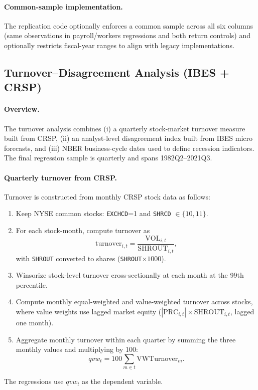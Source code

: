 \paragraph{Common-sample implementation.}
The replication code optionally enforces a common sample across all six columns (same observations in payroll/workers regressions and both return controls) and optionally restricts fiscal-year ranges to align with legacy implementations.

\subsection{Turnover--Disagreement Analysis (IBES + CRSP)}\label{app:data_turnover}

\paragraph{Overview.}
The turnover analysis combines (i) a quarterly stock-market turnover measure built from CRSP, (ii) an analyst-level disagreement index built from IBES micro forecasts, and (iii) NBER business-cycle dates used to define recession indicators. The final regression sample is quarterly and spans 1982Q2--2021Q3.

\paragraph{Quarterly turnover from CRSP.}
Turnover is constructed from monthly CRSP stock data as follows:
\begin{enumerate}
\item Keep NYSE common stocks: \texttt{EXCHCD}=1 and \texttt{SHRCD} $\in \{10,11\}$.
\item For each stock-month, compute turnover as
\[
\text{turnover}_{i,t}=\frac{\text{VOL}_{i,t}}{\text{SHROUT}_{i,t}},
\]
with \texttt{SHROUT} converted to shares (\texttt{SHROUT}$\times 1000$).
\item Winsorize stock-level turnover cross-sectionally at each month at the 99th percentile.
\item Compute monthly equal-weighted and value-weighted turnover across stocks, where value weights use lagged market equity (\(|\text{PRC}_{i,t}|\times \text{SHROUT}_{i,t}\), lagged one month).
\item Aggregate monthly turnover within each quarter by summing the three monthly values and multiplying by 100:
\[
qvw_t = 100\sum_{m\in t}\text{VWTurnover}_m.
\]
\end{enumerate}
The regressions use \(qvw_t\) as the dependent variable.

